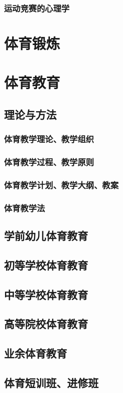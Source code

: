 \documentclass[UTF8]{../../ApplicationUniverse}
\begin{document}
        \subsubsection{运动竞赛的心理学}


\section{体育锻炼}
\section{体育教育}
    \subsection{理论与方法}
        \subsubsection{体育教学理论、教学组织}
        \subsubsection{体育教学过程、教学原则}
        \subsubsection{体育教学计划、教学大纲、教案}
        \subsubsection{体育教学法}
    \subsection{学前幼儿体育教育}
    \subsection{初等学校体育教育}
    \subsection{中等学校体育教育}
    \subsection{高等院校体育教育}
    \subsection{业余体育教育}
    \subsection{体育短训班、进修班}
\end{document}
